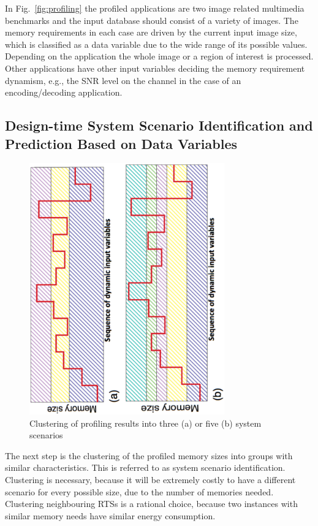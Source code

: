 \documentclass[smallcondensed]{svjour3}
\begin{document}
In Fig.~\ref{fig:profiling} the profiled applications are two image related multimedia benchmarks and the input database should consist of a variety of images. 
The memory requirements in each case are driven by the current input image size, which is classified as a data variable due to the wide range of its possible values. 
Depending on the application the whole image or a region of interest is processed. 
Other applications have other input variables deciding the memory requirement dynamism, e.g., the SNR level on the channel in the case of an encoding/decoding application.

\subsection{Design-time System Scenario Identification and Prediction Based on Data Variables}

\begin{figure}
\centering
\includegraphics[angle=270, width=0.75\textwidth]{Images/1Dclustering.ps}
\caption{Clustering of profiling results into three (a) or five (b) system scenarios}
\label{fig:clustering}
\end{figure}

The next step is the clustering of the profiled memory sizes into groups with similar characteristics. 
This is referred to as system scenario identification. 
Clustering is necessary, because it will be extremely costly to have a different scenario for every possible size, due to the number of memories needed. 
Clustering neighbouring RTSs is a rational choice, because two instances with similar memory needs have similar energy consumption. 
\end{document}
